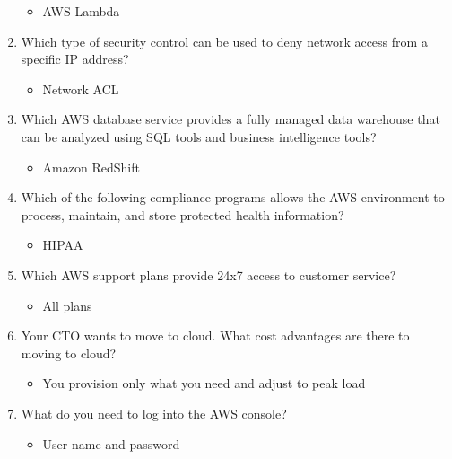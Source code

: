 \begin{enumerate}
	\begin{itemize}
	\item AWS Lambda
\end{itemize}

	\item Which type of security control can be used to deny network access from a specific IP address?

	\begin{itemize}
	\item Network ACL
\end{itemize}

	\item Which AWS database service provides a fully managed data warehouse that can be analyzed using SQL tools and business intelligence tools?

	\begin{itemize}
	\item Amazon RedShift
\end{itemize}

	\item Which of the following compliance programs allows the AWS environment to process, maintain, and store protected health information?

	\begin{itemize}
	\item HIPAA
\end{itemize}

	\item Which AWS support plans provide 24x7 access to customer service?

	\begin{itemize}
	\item All plans
\end{itemize}

	\item Your CTO wants to move to cloud. What cost advantages are there to moving to cloud?

	\begin{itemize}
	\item You provision only what you need and adjust to peak load
\end{itemize}

	\item What do you need to log into the AWS console?

	\begin{itemize}
	\item User name and password
\end{itemize}


\end{enumerate}
